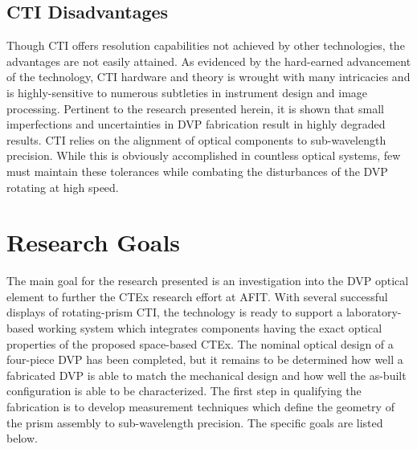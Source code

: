 \subsection{CTI Disadvantages}
Though \ac{CTI} offers resolution capabilities not achieved by other technologies, the advantages are not easily attained. As evidenced by the hard-earned advancement of the technology, \ac{CTI} hardware and theory is wrought with many intricacies and is highly-sensitive to numerous subtleties in instrument design and image processing. Pertinent to the research presented herein, it is shown that small imperfections and uncertainties in \ac{DVP} fabrication result in highly degraded results. \ac{CTI} relies on the alignment of optical components to sub-wavelength precision. While this is obviously accomplished in countless optical systems, few must maintain these tolerances while combating the disturbances of the \ac{DVP} rotating at high speed.

\section{Research Goals}

The main goal for the research presented is an investigation into the \ac{DVP} optical element to further the \ac{CTEx} research effort at \ac{AFIT}. With several successful displays of rotating-prism \ac{CTI}, the technology is ready to support a laboratory-based working system which integrates components having the exact optical properties of the proposed space-based \ac{CTEx}. The nominal optical design of a four-piece \ac{DVP} has been completed, but it remains to be determined how well a fabricated \ac{DVP} is able to match the mechanical design and how well the as-built configuration is able to be characterized. The first step in qualifying the fabrication is to develop measurement techniques which define the geometry of the prism assembly to sub-wavelength precision. The specific goals are listed below.



